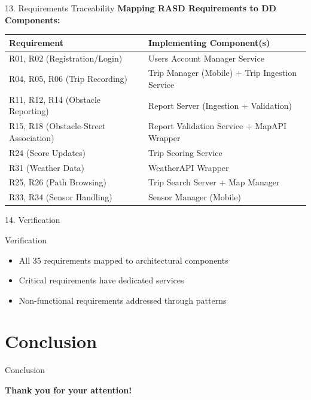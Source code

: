 \documentclass[aspectratio=169, 10pt]{beamer}
\begin{document}
\begin{frame}{13. Requirements Traceability}
    \textbf{Mapping RASD Requirements to DD Components:}
    
    \vspace{0.3cm}
    \centering
    \begin{tabularx}{0.9\textwidth}{lX}
        \toprule
        \textbf{Requirement} & \textbf{Implementing Component(s)} \\
        \midrule
        R01, R02 (Registration/Login) & Users Account Manager Service \\
        R04, R05, R06 (Trip Recording) & Trip Manager (Mobile) + Trip Ingestion Service \\
        R11, R12, R14 (Obstacle Reporting) & Report Server (Ingestion + Validation) \\
        R15, R18 (Obstacle-Street Association) & Report Validation Service + MapAPI Wrapper \\
        R24 (Score Updates) & Trip Scoring Service \\
        R31 (Weather Data) & WeatherAPI Wrapper \\
        R25, R26 (Path Browsing) & Trip Search Server + Map Manager \\
        R33, R34 (Sensor Handling) & Sensor Manager (Mobile) \\
        \bottomrule
    \end{tabularx}
\end{frame}
\begin{frame}{14. Verification} 
    \vspace{0.3cm}
    \begin{block}{Verification}
        \begin{itemize}
            \item All 35 requirements mapped to architectural components
            \item Critical requirements have dedicated services
            \item Non-functional requirements addressed through patterns
        \end{itemize}
    \end{block}
\end{frame}
\section{Conclusion}

    \begin{frame}{Conclusion}
    
    \vspace{0.5cm}
    \centering
    \color{BBPBlue}\Large
    \textbf{Thank you for your attention!}
\end{frame}
\end{document}
